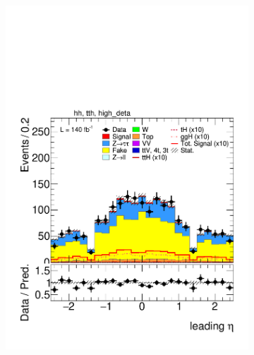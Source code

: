 \begin{figure}[htbp]
\begin{subfigure}[b]{0.45\textwidth}
          \includegraphics[width=\textwidth]{images/using_highdeta_ffs_run2_inclusive/plot_tau_0_eta_hh_tth_15_16_17_18_high_deta.pdf}
          \caption{}
        \end{subfigure}
    

\end{figure}
